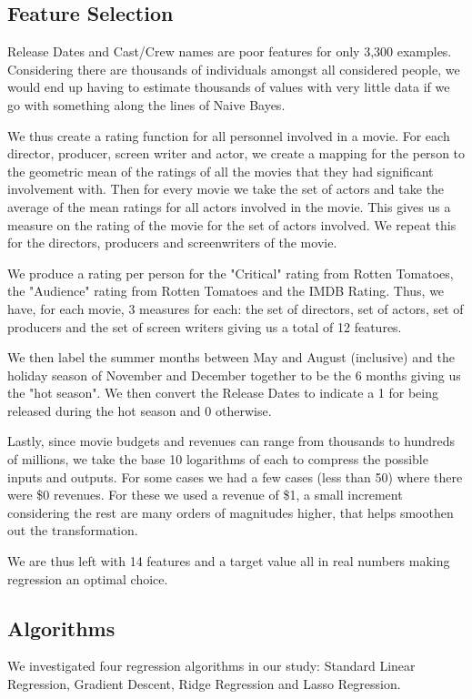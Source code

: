 \documentclass[conference]{IEEEtran}
\begin{document}
\subsection{Feature Selection}
Release Dates and Cast/Crew names are poor features for only 
3,300 examples. Considering there are thousands of individuals amongst
all considered people, we would end up having to estimate 
thousands of values with very little data if we go with something 
along the lines of Naive Bayes. 

We thus create a rating function for all personnel involved in a movie. 
For each director, producer, screen writer and actor, we create a mapping
for the person to the geometric mean of the ratings of all the movies that they 
had significant involvement with. Then for every movie we take the set of actors
and take the average of the mean ratings for all actors involved in the movie. This
gives us a measure on the rating of the movie for the set of actors involved. We 
repeat this for the directors, producers and screenwriters of the movie. 

We produce a rating per person for the "Critical" rating from Rotten Tomatoes, the "Audience" 
rating from Rotten Tomatoes and the IMDB Rating. Thus, we have, for each movie, 
3 measures for each: the set of directors, set of actors, set of producers and 
the set of screen writers giving us a total of 12 features. 

We then label the summer months between May and August (inclusive) and the 
holiday season of November and December together to be the 6 months giving
us the "hot season". We then convert the Release Dates to indicate a 1 
for being released during the hot season and 0 otherwise. 

Lastly, since movie budgets and revenues can range from thousands
to hundreds of millions, we take the base 10 logarithms of each to
compress the possible inputs and outputs. For some cases we had a 
few cases (less than 50) where there were \$0 revenues. For these we used a 
revenue of \$1, a small increment considering the rest are many orders
of magnitudes higher, that helps smoothen out the transformation.

We are thus left with 14 features and a target value all in real numbers making 
regression an optimal choice.

\subsection{Algorithms}
We investigated four regression algorithms in our study: 
Standard Linear Regression, Gradient Descent, Ridge Regression and 
Lasso Regression.
\end{document}
